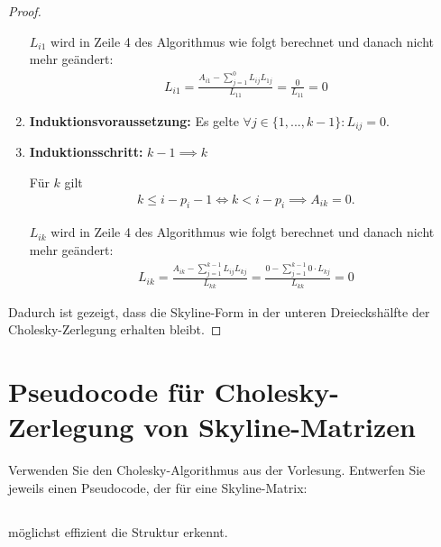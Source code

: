 \documentclass[titlepage]{article}
\begin{document}
\begin{proof}
\begin{enumerate}
		$L_{i1}$ wird in Zeile 4 des Algorithmus wie folgt berechnet und danach nicht mehr geändert:
		\begin{align*}
			L_{i1} = \frac{A_{i1} - \sum_{j=1}^{0}L_{ij}L_{1j}}{L_{11}} = \frac{0}{L_{11}} = 0
		\end{align*}
	
		\item \textbf{Induktionsvoraussetzung:} Es gelte $\forall j \in \{1, ..., k - 1\}: L_{ij} = 0$.
		
		\item \textbf{Induktionsschritt:} $k-1 \implies k$
		
		Für $k$ gilt
		\begin{align*}
			k \leq i - p_i - 1 \iff k < i - p_i \implies A_{ik} = 0.
		\end{align*}
		
		$L_{ik}$ wird in Zeile 4 des Algorithmus wie folgt berechnet und danach nicht mehr geändert:
		\begin{align*}
			L_{ik} = \frac{A_{ik} - \sum_{j=1}^{k-1}L_{ij}L_{kj}}{L_{kk}} = \frac{0 - \sum_{j=1}^{k - 1}0\cdot L_{kj}}{L_{kk}} = 0
		\end{align*}
	\end{enumerate}
	
	Dadurch ist gezeigt, dass die Skyline-Form in der unteren Dreieckshälfte der Cholesky-Zerlegung erhalten bleibt.
\end{proof}
\newpage



\section{Pseudocode für Cholesky-Zerlegung von Skyline-Matrizen}
Verwenden Sie den Cholesky-Algorithmus aus der Vorlesung. Entwerfen Sie jeweils einen Pseudocode, der für eine Skyline-Matrix:


\subsection{}
möglichst effizient die Struktur erkennt.
\end{document}
